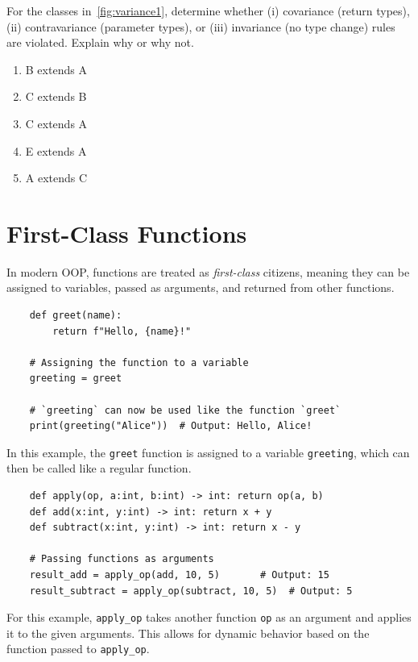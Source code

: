 \documentclass[oneside,11pt,dvipsnames]{book}
\newcommand{\code}[1]{\texttt{#1}}
\begin{document}
For the classes in~\autoref{fig:variance1}, determine whether (i) covariance (return types), (ii) contravariance (parameter types), or (iii) invariance (no type change) rules are violated. Explain why or why not.

\begin{enumerate}
    \item B extends A
	\item C extends B
    \item C extends A
	\item E extends A
	\item A extends C
\end{enumerate}
    

\chapter{First-Class Functions}\label{chap:first-class-functions}

In modern OOP, functions are treated as \emph{first-class} citizens, meaning they can be assigned to variables, passed as arguments, and returned from other functions.


\begin{lstlisting}
    def greet(name):
        return f"Hello, {name}!"

    # Assigning the function to a variable
    greeting = greet

    # `greeting` can now be used like the function `greet`
    print(greeting("Alice"))  # Output: Hello, Alice!
\end{lstlisting}

In this example, the \code{greet} function is assigned to a variable \code{greeting}, which can then be called like a regular function. 

\begin{lstlisting}
    def apply(op, a:int, b:int) -> int: return op(a, b)        
    def add(x:int, y:int) -> int: return x + y        
    def subtract(x:int, y:int) -> int: return x - y        

    # Passing functions as arguments
    result_add = apply_op(add, 10, 5)       # Output: 15
    result_subtract = apply_op(subtract, 10, 5)  # Output: 5
\end{lstlisting}

For this example, \code{apply\_op} takes another function \code{op} as an argument and applies it to the given arguments. This allows for dynamic behavior based on the function passed to \code{apply\_op}.
\end{document}
